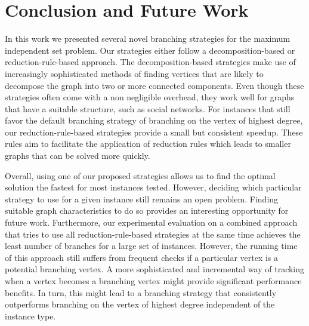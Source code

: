 \documentclass[a4paper,UKenglish,cleveref, autoref, thm-restate]{lipics-v2021}
\begin{document}
\section{Conclusion and Future Work}
In this work we presented several novel branching strategies for the maximum independent set problem.
Our strategies either follow a decomposition-based or reduction-rule-based approach.
The decomposition-based strategies make use of increasingly sophisticated methods of finding vertices that are likely to decompose the graph into two or more connected components.
Even though these strategies often come with a non negligible overhead, they work well for graphs that have a suitable structure, such as social networks.
For instances that still favor the default branching strategy of branching on the vertex of highest degree, our reduction-rule-based strategies provide a small but consistent speedup.
These rules aim to facilitate the application of reduction rules which leads to smaller graphs that can be solved more quickly.

Overall, using one of our proposed strategies allows us to find the optimal solution the fastest for most instances tested.
However, deciding which particular strategy to use for a given instance still remains an open problem.
Finding suitable graph characteristics to do so provides an interesting opportunity for future work.
Furthermore, our experimental evaluation on a combined approach that tries to use all reduction-rule-based strategies at the same time achieves the least number of branches for a large set of instances.
However, the running time of this approach still suffers from frequent checks if a particular vertex is a potential branching vertex.
A more sophisticated and incremental way of tracking when a vertex becomes a branching vertex might provide significant performance benefits.
In turn, this might lead to a branching strategy that consistently outperforms branching on the vertex of highest degree independent of the instance type.

\FloatBarrier
\newpage




\newpage

\appendix
\end{document}
